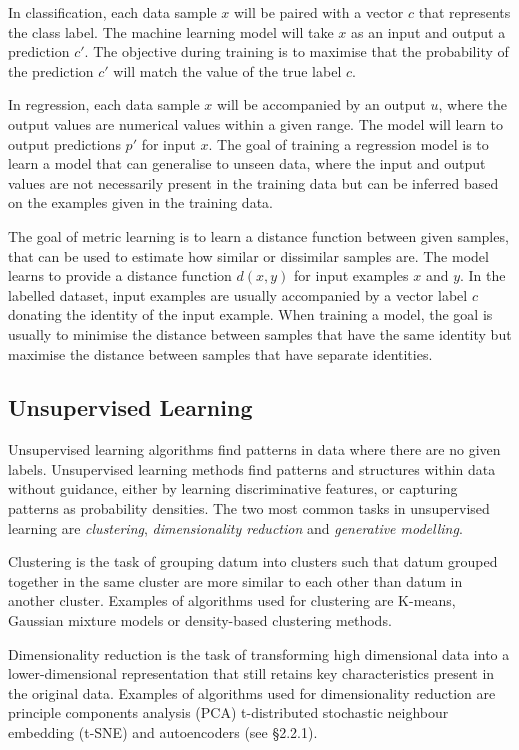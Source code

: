 In classification, each data sample $x$ will be paired with a vector $c$ that represents the class label. 
The machine learning model will take $x$ as an input and output a prediction $c'$. 
The objective during training is to maximise that the probability of the prediction $c'$ will match the value of the true label $c$. 

In regression, each data sample $x$ will be accompanied by an output $u$, where the output values are numerical values within a given range. 
The model will learn to output predictions $p'$ for input $x$. The goal of training a regression model is to learn a model that can generalise to unseen data, where the input and output values are not necessarily present in the training data but can be inferred based on the examples given in the training data. 

The goal of metric learning is to learn a distance function between given samples, that can be used to estimate how similar or dissimilar samples are. 
The model learns to provide a distance function $d(x,y)$ for input examples $x$ and $y$. In the labelled dataset, input examples are usually accompanied by a vector label $c$ donating the identity of the input example. 
When training a model, the goal is usually to minimise the distance between samples that have the same identity but maximise the distance between samples that have separate identities.

\subsection{Unsupervised Learning}

Unsupervised learning algorithms find patterns in data where there are no given labels. 
Unsupervised learning methods find patterns and structures within data without guidance, either by learning discriminative features, or capturing patterns as probability densities. 
The two most common tasks in unsupervised learning are \textit{clustering}, \textit{dimensionality reduction} and \textit{generative modelling}.

Clustering is the task of grouping datum into clusters such that datum grouped together in the same cluster are more similar to each other than datum in another cluster. 
Examples of algorithms used for clustering are K-means, Gaussian mixture models or density-based clustering methods.

Dimensionality reduction is the task of transforming high dimensional data into a lower-dimensional representation that still retains key characteristics present in the original data. 
Examples of algorithms used for dimensionality reduction are principle components analysis (PCA) t-distributed stochastic neighbour embedding (t-SNE) and autoencoders (see \S2.2.1). 

